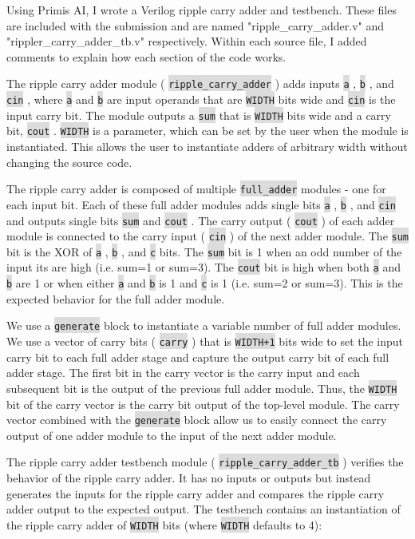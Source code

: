 \documentclass[fleqn]{article}
\newcommand{\code}[1]{%
	\colorbox{Gainsboro}{\texttt{#1}}%
}
\begin{document}
\begin{enumerate}
		 Using Primis AI, I wrote a Verilog ripple carry adder and testbench. These files are included with the submission and are named "ripple\_carry\_adder.v" and "rippler\_carry\_adder\_tb.v" respectively. Within each source file, I added comments to explain how each section of the code works.
		 
		 The ripple carry adder module (\code{ripple\_carry\_adder}) adds inputs \code{a}, \code{b}, and \code{cin}, where \code{a} and \code{b} are input operands that are \code{WIDTH} bits wide and \code{cin} is the input carry bit. The module outputs a \code{sum} that is \code{WIDTH} bits wide and a carry bit, \code{cout}. \code{WIDTH} is a parameter, which can be set by the user when the module is instantiated. This allows the user to instantiate adders of arbitrary width without changing the source code.
		 
		The ripple carry adder is composed of multiple \code{full\_adder} modules - one for each input bit. Each of these full adder modules adds single bits \code{a}, \code{b}, and \code{cin} and outputs single bits \code{sum} and \code{cout}. The carry output (\code{cout}) of each adder module is connected to the carry input (\code{cin}) of the next adder module. The \code{sum} bit is the XOR of \code{a}, \code{b}, and \code{c} bits. The \code{sum} bit is 1 when an odd number of the input its are high (i.e. sum=1 or sum=3). The \code{cout} bit is high when both \code{a} and \code{b} are 1 or when either \code{a} and \code{b} is 1 and \code{c} is 1 (i.e. sum=2 or sum=3). This is the expected behavior for the full adder module.
		
		We use a \code{generate} block to instantiate a variable number of full adder modules. We use a vector of carry bits (\code{carry}) that is \code{WIDTH+1} bits wide to set the input carry bit to each full adder stage and capture the output carry bit of each full adder stage. The first bit in the carry vector is the carry input and each subsequent bit is the output of the previous full adder module. Thus, the \code{WIDTH} bit of the carry vector is the carry bit output of the top-level module. The carry vector combined with the \code{generate} block allow us to easily connect the carry output of one adder module to the input of the next adder module.
		 
		 The ripple carry adder testbench module (\code{ripple\_carry\_adder\_tb}) verifies the behavior of the ripple carry adder. It has no inputs or outputs but instead generates the inputs for the ripple carry adder and compares the ripple carry adder output to the expected output. The testbench contains an instantiation of the ripple carry adder of \code{WIDTH} bits (where \code{WIDTH} defaults to 4):
		 

\end{enumerate}
\end{document}
